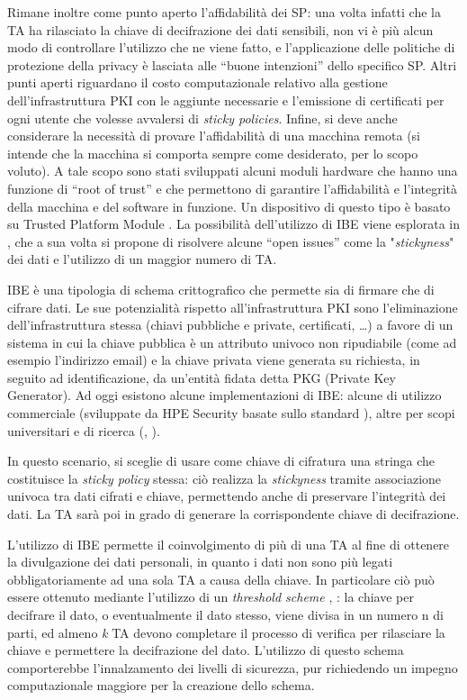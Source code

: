 Rimane inoltre come punto aperto l’affidabilit\`a dei SP: una volta infatti che la TA ha rilasciato la chiave di decifrazione dei dati sensibili, non vi è pi\`u alcun modo di controllare l’utilizzo che ne viene fatto, e l’applicazione delle politiche di protezione della privacy \`e lasciata alle “buone intenzioni” dello specifico SP. Altri punti aperti riguardano il costo computazionale relativo alla gestione dell’infrastruttura PKI con le aggiunte necessarie e l’emissione di certificati per ogni utente che volesse avvalersi di \textit{sticky policies}. Infine, si deve anche considerare la necessit\`a di provare l’affidabilit\`a di una macchina remota (si intende che la macchina si comporta sempre come desiderato, per lo scopo voluto). A tale scopo sono stati sviluppati alcuni moduli hardware che hanno una funzione di “root of trust” e che permettono di garantire l’affidabilit\`a e l’integrit\`a della macchina e del software in funzione. Un dispositivo di questo tipo \`e basato su Trusted Platform Module \cite{standard2009trusted}.
La possibilit\`a dell’utilizzo di IBE viene esplorata in \cite{mont2003towards}, che a sua volta si propone di risolvere alcune “open issues” come la "\textit{stickyness}" dei dati e l’utilizzo di un maggior numero di TA.

IBE \cite{shamir1984identity} \`e una tipologia di schema crittografico che permette sia di firmare che di cifrare dati. Le sue potenzialit\`a rispetto all’infrastruttura PKI sono l’eliminazione dell’infrastruttura stessa (chiavi pubbliche e private, certificati, …) a favore di un sistema in cui la chiave pubblica \`e un attributo univoco non ripudiabile (come ad esempio l’indirizzo email) e la chiave privata viene generata su richiesta, in seguito ad identificazione, da un’entit\`a fidata detta PKG (Private Key Generator).
Ad oggi esistono alcune implementazioni di IBE: alcune di utilizzo commerciale (sviluppate da HPE Security \cite{IBEimplVoltage} basate sullo standard \cite{boyen2007identity}), altre per scopi universitari e di ricerca (\cite{Lynn2013}, \cite{ducas2016}).

In questo scenario, si sceglie di usare come chiave di cifratura una stringa che costituisce la \textit{sticky policy} stessa: ci\`o realizza la \textit{stickyness} tramite associazione univoca tra dati cifrati e chiave, permettendo anche di preservare l’integrit\`a dei dati. La TA sar\`a poi in grado di generare la corrispondente chiave di decifrazione.

L’utilizzo di IBE permette il coinvolgimento di pi\`u di una TA al fine di ottenere la divulgazione dei dati personali, in quanto i dati non sono pi\`u legati obbligatoriamente ad una sola TA a causa della chiave. In particolare ci\`o può essere ottenuto mediante l’utilizzo di un \textit{threshold scheme} \cite{shamir1979scheme}, \cite{sahai2005fuzzy}: la chiave per decifrare il dato, o eventualmente il dato stesso, viene divisa in un numero n di parti, ed almeno \textit{k} TA devono completare il processo di verifica per rilasciare la chiave e permettere la decifrazione del dato. L’utilizzo di questo schema comporterebbe l’innalzamento dei livelli di sicurezza, pur richiedendo un impegno computazionale maggiore per la creazione dello schema.

